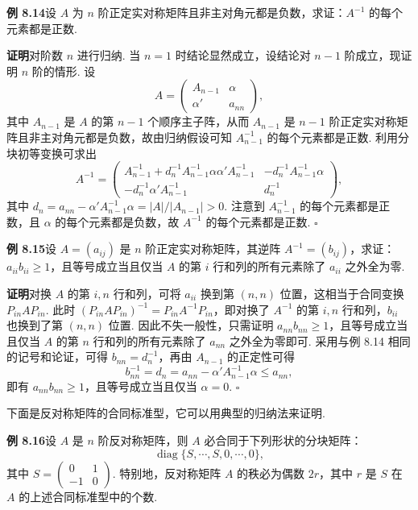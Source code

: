 \documentclass[UTF8, 12pt, fontset=fandol, oneside]{ctexart}
\begin{document}
\noindent\textbf{例 8.14}\quad 设 $A$ 为 $n$ 阶正定实对称矩阵且非主对角元都是负数，求证：$A^{-1}$ 的每个元素都是正数.

\noindent\textbf{证明}\quad 对阶数 $n$ 进行归纳. 当 $n=1$ 时结论显然成立，设结论对 $n-1$ 阶成立，现证明 $n$ 阶的情形. 设
\[
A=\left(\begin{array}{cc}
A_{n-1} & \alpha\\
\alpha' & a_{nn}
\end{array}\right),
\]
其中 $A_{n-1}$ 是 $A$ 的第 $n-1$ 个顺序主子阵，从而 $A_{n-1}$ 是 $n-1$ 阶正定实对称矩阵且非主对角元都是负数，故由归纳假设可知 $A_{n-1}^{-1}$ 的每个元素都是正数. 利用分块初等变换可求出
\[
A^{-1}=\left(\begin{array}{cc}
A_{n-1}^{-1}+d_n^{-1}A_{n-1}^{-1}\alpha\alpha'A_{n-1}^{-1} &
-d_n^{-1}A_{n-1}^{-1}\alpha\\
-d_n^{-1}\alpha'A_{n-1}^{-1} & d_n^{-1}
\end{array}\right),
\]
其中 $d_n=a_{nn}-\alpha'A_{n-1}^{-1}\alpha=|A|/|A_{n-1}|>0$. 注意到 $A_{n-1}^{-1}$ 的每个元素都是正数，且 $\alpha$ 的每个元素都是负数，故 $A^{-1}$ 的每个元素都是正数. $\ensuremath{\square}$

\noindent\textbf{例 8.15}\quad 设 $A=(a_{ij})$ 是 $n$ 阶正定实对称矩阵，其逆阵 $A^{-1}=(b_{ij})$，求证：$a_{ii}b_{ii}\ge 1$，且等号成立当且仅当 $A$ 的第 $i$ 行和列的所有元素除了 $a_{ii}$ 之外全为零.

\noindent\textbf{证明}\quad 对换 $A$ 的第 $i,n$ 行和列，可将 $a_{ii}$ 换到第 $(n,n)$ 位置，这相当于合同变换 $P_{in}AP_{in}$. 此时 $(P_{in}AP_{in})^{-1}=P_{in}A^{-1}P_{in}$，即对换了 $A^{-1}$ 的第 $i,n$ 行和列，$b_{ii}$ 也换到了第 $(n,n)$ 位置. 因此不失一般性，只需证明 $a_{nn}b_{nn}\ge 1$，且等号成立当且仅当 $A$ 的第 $n$ 行和列的所有元素除了 $a_{nn}$ 之外全为零即可. 采用与例 8.14 相同的记号和论证，可得 $b_{nn}=d_n^{-1}$，再由 $A_{n-1}$ 的正定性可得
\[
b_{nn}^{-1}=d_n=a_{nn}-\alpha'A_{n-1}^{-1}\alpha\le a_{nn},
\]
即有 $a_{nn}b_{nn}\ge 1$，且等号成立当且仅当 $\alpha=0$. $\ensuremath{\square}$

下面是反对称矩阵的合同标准型，它可以用典型的归纳法来证明.

\noindent\textbf{例 8.16}\quad 设 $A$ 是 $n$ 阶反对称矩阵，则 $A$ 必合同于下列形状的分块矩阵：
\begin{equation}
\operatorname{diag}\{S,\cdots,S,0,\cdots,0\},
\tag{8.2}
\end{equation}
其中 $S=\left(\begin{array}{cc}0&1\\ -1&0\end{array}\right)$. 特别地，反对称矩阵 $A$ 的秩必为偶数 $2r$，其中 $r$ 是 $S$ 在 $A$ 的上述合同标准型中的个数.
\end{document}
